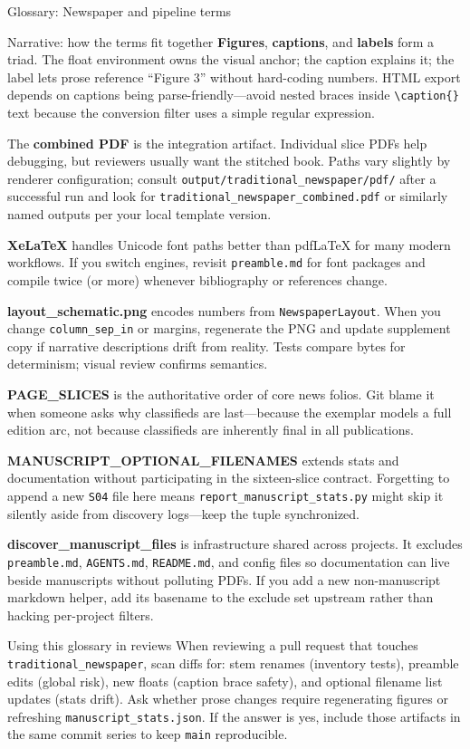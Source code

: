 \documentclass[
  ignorenonframetext,
]{beamer}
\begin{document}
\begin{frame}[fragile]{Glossary: Newspaper and pipeline terms}
\begin{block}{Narrative: how the terms fit together}
\textbf{Figures}, \textbf{captions}, and \textbf{labels} form a triad.
The float environment owns the visual anchor; the caption explains it;
the label lets prose reference ``Figure 3'' without hard-coding numbers.
HTML export depends on captions being parse-friendly---avoid nested
braces inside \texttt{\textbackslash{}caption\{\}} text because the
conversion filter uses a simple regular expression.

The \textbf{combined PDF} is the integration artifact. Individual slice
PDFs help debugging, but reviewers usually want the stitched book. Paths
vary slightly by renderer configuration; consult
\texttt{output/traditional\_newspaper/pdf/} after a successful run and
look for \texttt{traditional\_newspaper\_combined.pdf} or similarly
named outputs per your local template version.

\textbf{XeLaTeX} handles Unicode font paths better than pdfLaTeX for
many modern workflows. If you switch engines, revisit
\texttt{preamble.md} for font packages and compile twice (or more)
whenever bibliography or references change.

\textbf{layout\_schematic.png} encodes numbers from
\texttt{NewspaperLayout}. When you change \texttt{column\_sep\_in} or
margins, regenerate the PNG and update supplement copy if narrative
descriptions drift from reality. Tests compare bytes for determinism;
visual review confirms semantics.

\textbf{PAGE\_SLICES} is the authoritative order of core news folios.
Git blame it when someone asks why classifieds are last---because the
exemplar models a full edition arc, not because classifieds are
inherently final in all publications.

\textbf{MANUSCRIPT\_OPTIONAL\_FILENAMES} extends stats and documentation
without participating in the sixteen-slice contract. Forgetting to
append a new \texttt{S04} file here means
\texttt{report\_manuscript\_stats.py} might skip it silently aside from
discovery logs---keep the tuple synchronized.

\textbf{discover\_manuscript\_files} is infrastructure shared across
projects. It excludes \texttt{preamble.md}, \texttt{AGENTS.md},
\texttt{README.md}, and config files so documentation can live beside
manuscripts without polluting PDFs. If you add a new non-manuscript
markdown helper, add its basename to the exclude set upstream rather
than hacking per-project filters.
\end{block}

\begin{block}{Using this glossary in reviews}
\protect{}\label{using-this-glossary-in-reviews}
When reviewing a pull request that touches
\texttt{traditional\_newspaper}, scan diffs for: stem renames (inventory
tests), preamble edits (global risk), new floats (caption brace safety),
and optional filename list updates (stats drift). Ask whether prose
changes require regenerating figures or refreshing
\texttt{manuscript\_stats.json}. If the answer is yes, include those
artifacts in the same commit series to keep \texttt{main} reproducible.


\end{block}
\end{frame}
\end{document}
